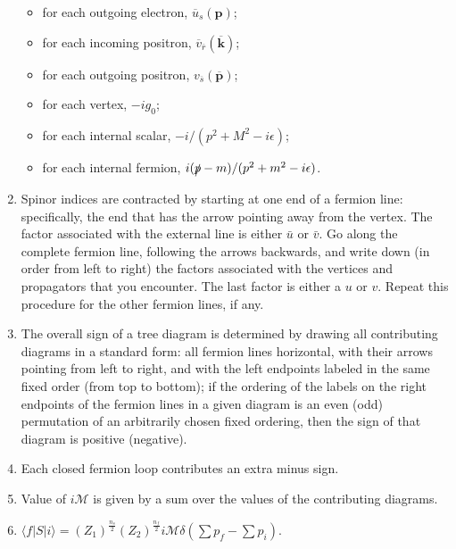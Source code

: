 \begin{enumerate}
\begin{itemize}
\item for each outgoing electron, $\overline{u}_{s}(\bm{p})$;
\item for each incoming positron, $\overline{v}_{\overline{r}}(\overline{\bm{k}})$;
\item for each outgoing positron, $v_{\overline{s}}(\overline{\bm{p}})$;
\item for each vertex, $-ig_0$;
\item for each internal scalar, ${-i}/{(p^2+M^2-i\epsilon)}$;
\item for each internal fermion, ${i(\slashed{p}-m)}/{(p^2+m^2-i\epsilon)}$.
\end{itemize}
\item Spinor indices are contracted by starting at one end of a fermion line: specifically, the end that has the arrow pointing away from the vertex. The factor associated with the external line is either $\bar{u}$ or $\bar{v}$. Go along the complete fermion line, following the arrows backwards, and write down (in order from left to right) the factors associated with the vertices and propagators that you encounter. The last factor is either a $u$ or $v$. Repeat this procedure for the other fermion lines, if any.
\item The overall sign of a tree diagram is determined by drawing all contributing diagrams in a standard form: all fermion lines horizontal, with their arrows pointing from left to right, and with the left endpoints labeled in the same fixed order (from top to bottom); if the ordering of the labels on the right endpoints of the fermion lines in a given diagram is an even (odd) permutation of an arbitrarily chosen fixed ordering, then the sign of that diagram is positive (negative).
\item Each closed fermion loop contributes an extra minus sign.
\item Value of $i\mathcal{M}$ is given by a sum over the values of the contributing diagrams.
\item $\langle f | S | i \rangle = (Z_1)^{\frac{n_s}{2}} (Z_2)^{\frac{n_f}{2}}i\mathcal{M}\delta(\sum p_f -\sum p_i)$.
\end{enumerate}

